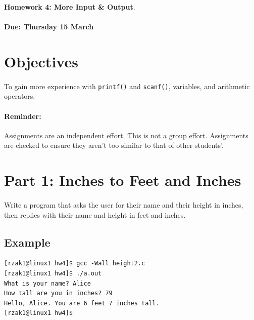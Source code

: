 \documentclass[letter,11pt]{article}
\begin{document}
\huge
\textbf{Homework 4: More Input \& Output}.
\normalsize
\\ ~~ \\
\textbf{Due: Thursday 15 March}

\section*{Objectives}
\paragraph{}To gain more experience with \texttt{printf()} and \texttt{scanf()}, variables, and arithmetic operators.

\paragraph{Reminder:} Assignments are an independent effort. \underline{This is not a group effort}. Assignments are checked to ensure they aren't too similar to that of other students'.

\section*{Part 1: Inches to Feet and Inches}
\paragraph{}Write a program that asks the user for their name and their height in inches, then replies with their name and height in feet and inches. 

\subsection*{Example}
\begin{verbatim}
[rzak1@linux1 hw4]$ gcc -Wall height2.c
[rzak1@linux1 hw4]$ ./a.out
What is your name? Alice
How tall are you in inches? 79
Hello, Alice. You are 6 feet 7 inches tall.
[rzak1@linux1 hw4]$ 
\end{verbatim}
\end{document}
